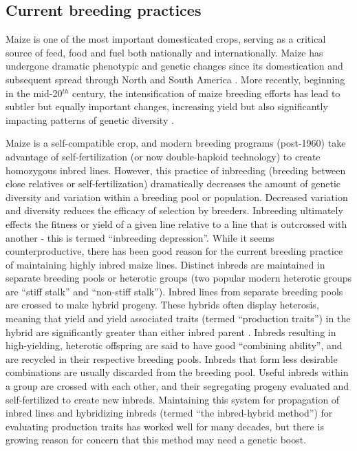 \documentclass[12pt]{article}
\begin{document}
\subsection*{Current breeding practices}
Maize is one of the most important domesticated crops, serving as a critical source of feed, food and fuel both nationally and internationally. 
Maize has undergone dramatic phenotypic and genetic changes since its domestication and subsequent spread through North and South America \citep{daFonseca:2015ey} \citep{Doebley:2004ce}. More recently, beginning in the mid-20$^{th}$ century, the intensification of maize breeding efforts has lead to subtler but equally important changes, increasing yield but also significantly impacting patterns of genetic diversity \citep{Duvick:2001fy} \citep{vanHeerwaarden:2012im}.

Maize is  a self-compatible crop, and modern breeding programs (post-1960) take advantage of self-fertilization (or now double-haploid technology) to create homozygous inbred lines. 
However, this practice of  inbreeding (breeding between close relatives or self-fertilization) dramatically decreases the amount of genetic diversity and variation \citep{Charlesworth:2001to} within a breeding pool or population.  
Decreased variation and diversity reduces the efficacy of selection by breeders. Inbreeding ultimately effects the fitness or yield of a given line relative to a line that is outcrossed with another - this is termed ``inbreeding depression''. While it seems counterproductive, there has been good reason for the current breeding practice of maintaining highly inbred maize lines. 
Distinct inbreds are maintained in separate breeding pools or heterotic groups (two popular modern heterotic groups are ``stiff stalk'' and ``non-stiff stalk'').
Inbred lines from separate breeding pools are crossed to make hybrid progeny.  
These hybrids often display heterosis, meaning that yield and yield associated traits (termed ``production traits'') in the hybrid are significantly greater than either inbred parent \citep{Springer:2007bj}.  
Inbreds resulting in high-yielding, heterotic offspring are said to have good ``combining ability'', and are recycled in their respective breeding pools.
Inbreds that form less desirable combinations are usually discarded from the breeding pool. 
Useful inbreds within a group are crossed with each other, and their segregating progeny evaluated and self-fertilized to create new inbreds. 
Maintaining this system for propagation of inbred lines and hybridizing inbreds (termed ``the inbred-hybrid method'') for evaluating production traits has worked well for many decades, but there is growing reason for concern that this method may need a genetic boost. 
\end{document}
